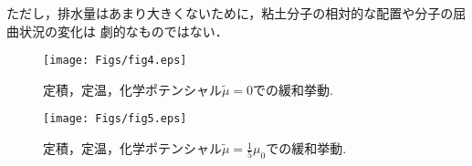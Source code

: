 ただし，排水量はあまり大きくないために，粘土分子の相対的な配置や分子の屈曲状況の変化は
劇的なものではない．
\begin{figure}[h]
	\begin{center}
	\texttt{[image: Figs/fig4.eps]} 
	\end{center}
	\caption{
		定積，定温，化学ポテンシャル$\tilde \mu =0$での緩和挙動.
	} 
	\label{fig:fig4}
\end{figure}
\begin{figure}[h]
	\begin{center}
	\texttt{[image: Figs/fig5.eps]} 
	\end{center}
	\caption{
		定積，定温，化学ポテンシャル$\tilde \mu =\frac{1}{5}\mu_0 $での緩和挙動.
	} 
	\label{fig:fig5}
\end{figure}
